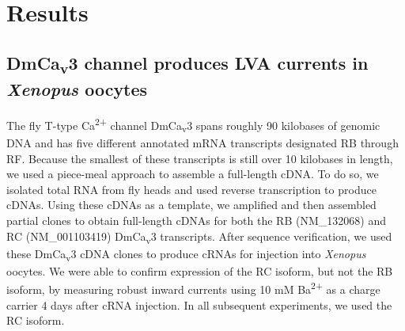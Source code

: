 \section*{Results}

\subsection*{DmCa\textsubscript{v}3 channel produces LVA currents in \emph{Xenopus} oocytes}

The fly T-type Ca\textsuperscript{2+} channel DmCa\textsubscript{v}3 spans roughly 90 kilobases of genomic DNA and has five different annotated mRNA transcripts designated RB through RF.
Because the smallest of these transcripts is still over 10 kilobases in length, we used a piece-meal approach to assemble a full-length cDNA.
To do so, we isolated total RNA from fly heads and used reverse transcription to produce cDNAs.
Using these cDNAs as a template, we amplified and then assembled partial clones to obtain full-length cDNAs for both the RB (NM_132068) and RC (NM_001103419) DmCa\textsubscript{v}3 transcripts.
After sequence verification, we used these DmCa\textsubscript{v}3 cDNA clones to produce cRNAs for injection into \emph{Xenopus} oocytes.
We were able to confirm expression of the RC isoform, but not the RB isoform, by measuring robust inward currents using 10 mM Ba\textsuperscript{2+} as a charge carrier 4 days after cRNA injection. 
In all subsequent experiments, we used the RC isoform.


